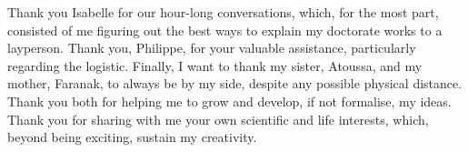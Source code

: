 Thank you Isabelle for our hour-long conversations,
which, for the most part, consisted of me figuring out the best ways
to explain my doctorate works to a layperson.
Thank you, Philippe, for your valuable assistance, particularly regarding the logistic.
Finally, I want to thank my sister, Atoussa, and my mother, Faranak,
to always be by my side, despite any possible physical distance.
Thank you both for helping me to grow and develop,
if not formalise, my ideas.
Thank you for sharing with me your own scientific and life interests,
which, beyond being exciting, sustain my creativity.


